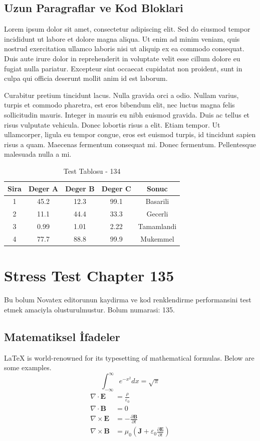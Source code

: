 \documentclass[12pt,a4paper]{article}
\begin{document}
\subsection{Uzun Paragraflar ve Kod Bloklari}
Lorem ipsum dolor sit amet, consectetur adipiscing elit. Sed do eiusmod tempor incididunt ut labore et dolore magna aliqua. Ut enim ad minim veniam, quis nostrud exercitation ullamco laboris nisi ut aliquip ex ea commodo consequat. Duis aute irure dolor in reprehenderit in voluptate velit esse cillum dolore eu fugiat nulla pariatur. Excepteur sint occaecat cupidatat non proident, sunt in culpa qui officia deserunt mollit anim id est laborum.

Curabitur pretium tincidunt lacus. Nulla gravida orci a odio. Nullam varius, turpis et commodo pharetra, est eros bibendum elit, nec luctus magna felis sollicitudin mauris. Integer in mauris eu nibh euismod gravida. Duis ac tellus et risus vulputate vehicula. Donec lobortis risus a elit. Etiam tempor. Ut ullamcorper, ligula eu tempor congue, eros est euismod turpis, id tincidunt sapien risus a quam. Maecenas fermentum consequat mi. Donec fermentum. Pellentesque malesuada nulla a mi.

\begin{table}[h!]
\centering
\begin{tabular}{|c|c|c|c|c|}
\hline
\textbf{Sira} & \textbf{Deger A} & \textbf{Deger B} & \textbf{Deger C} & \textbf{Sonuc} \\
\hline
1 & 45.2 & 12.3 & 99.1 & Basarili \\
2 & 11.1 & 44.4 & 33.3 & Gecerli \\
3 & 0.99 & 1.01 & 2.22 & Tamamlandi \\
4 & 77.7 & 88.8 & 99.9 & Mukemmel \\
\hline
\end{tabular}
\caption{Test Tablosu - 134}
\end{table}

\newpage
\section{Stress Test Chapter 135}
Bu bolum Novatex editorunun kaydirma ve kod renklendirme performansini test etmek amaciyla olusturulmustur. Bolum numarasi: 135.

\subsection{Matematiksel İfadeler}
\LaTeX{} is world-renowned for its typesetting of mathematical formulas. Below are some examples.
\begin{equation}
\int_{-\infty}^{\infty} e^{-x^2} dx = \sqrt{\pi}
\end{equation}
\begin{align}
\nabla \cdot \mathbf{E} &= \frac{\rho}{\varepsilon_0} \\
\nabla \cdot \mathbf{B} &= 0 \\
\nabla \times \mathbf{E} &= -\frac{\partial \mathbf{B}}{\partial t} \\
\nabla \times \mathbf{B} &= \mu_0\left(\mathbf{J} + \varepsilon_0 \frac{\partial \mathbf{E}}{\partial t}\right)
\end{align}
\end{document}
